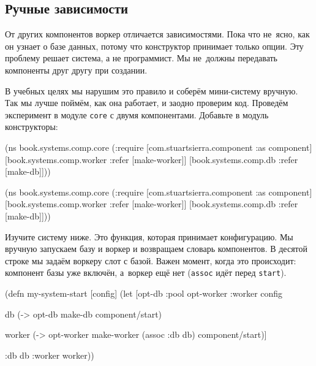 \subsection{Ручные зависимости}


От других компонентов воркер отличается зависимостями. Пока что не~ясно, как он
узнает о базе данных, потому что конструктор принимает только опции. Эту
проблему решает система, а не программист. Мы не~должны передавать компоненты
друг другу при создании.

В учебных целях мы нарушим это правило и соберём мини-систему вручную. Так мы
лучше поймём, как она работает, и заодно проверим код. Проведём эксперимент в
модуле \verb|core| с двумя компонентами. Добавьте в модуль конструкторы:

\ifnarrow

\begin{english}
  \begin{clojure}
(ns book.systems.comp.core
  (:require
   [com.stuartsierra.component
    :as component]
   [book.systems.comp.worker
    :refer [make-worker]]
   [book.systems.comp.db
    :refer [make-db]]))
  \end{clojure}
\end{english}

\else

\begin{english}
  \begin{clojure}
(ns book.systems.comp.core
  (:require
   [com.stuartsierra.component :as component]
   [book.systems.comp.worker :refer [make-worker]]
   [book.systems.comp.db :refer [make-db]]))
  \end{clojure}
\end{english}

\fi

Изучите систему ниже. Это функция, которая принимает конфигурацию. Мы вручную
запускаем базу и воркер и возвращаем словарь компонентов. В десятой строке мы
задаём воркеру слот с базой. Важен момент, когда это происходит: компонент базы
уже включён, а~воркер ещё нет (\verb|assoc| идёт перед \verb|start|).

\begin{english}
  \begin{clojure/lines}
(defn my-system-start
  [config]
  (let [{opt-db :pool
         opt-worker :worker} config

        db (-> opt-db
               make-db
               component/start)

        worker (-> opt-worker
                   make-worker
                   (assoc :db db)
                   component/start)]

    {:db db :worker worker}))
  \end{clojure/lines}
\end{english}

